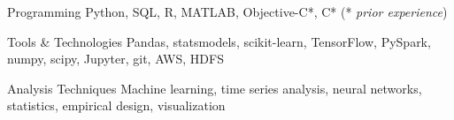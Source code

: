 
\begin{cvskills}

  \cvskill
    {Programming} %
    {Python, SQL, R, MATLAB, Objective-C*, C* (* \textit{prior experience})} %

  \cvskill
    {Tools \& Technologies} %
    {Pandas, statsmodels, scikit-learn, TensorFlow, PySpark, numpy, scipy, Jupyter, git, AWS, HDFS} %


  \cvskill
    {Analysis Techniques} %
    {Machine learning, time series analysis, neural networks, statistics, empirical design, visualization} %

\end{cvskills}
